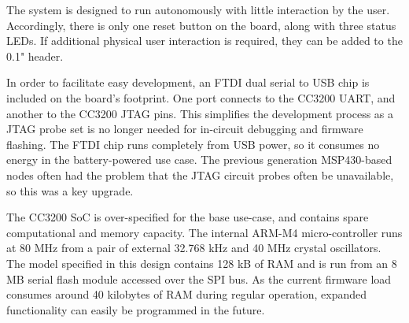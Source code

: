 The system is designed to run autonomously with little interaction by the user. Accordingly, there is only one reset button on the board, along with three status LEDs. If additional physical user interaction is required, they can be added to the 0.1" header. 

In order to facilitate easy development, an FTDI dual serial to USB chip is included on the board's footprint. One port connects to the CC3200 UART, and another to the CC3200 JTAG pins. This simplifies the development process as a JTAG probe set is no longer needed for in-circuit debugging and firmware flashing. The FTDI chip runs completely from USB power, so it consumes no energy in the battery-powered use case. The previous generation MSP430-based nodes often had the problem that the JTAG circuit probes often be unavailable, so this was a key upgrade.

The CC3200 SoC is over-specified for the base use-case, and contains spare computational and memory capacity. The internal ARM-M4 micro-controller runs at 80 MHz from a pair of external 32.768 kHz and 40 MHz crystal oscillators. The model specified in this design contains 128 kB of RAM and is run from an 8 MB serial flash module accessed over the SPI bus. As the current firmware load consumes around 40 kilobytes of RAM during regular operation, expanded functionality can easily be programmed in the future.


